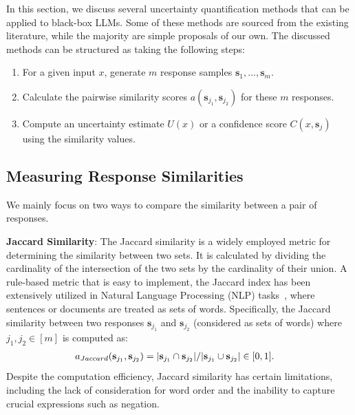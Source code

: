In this section, we discuss several uncertainty quantification methods that can be applied to black-box LLMs. 
Some of these methods are sourced from the existing literature, while the majority are simple proposals of our own. 
The discussed methods can be structured as taking the following steps:
\begin{enumerate}
    \item For a given input $x$, generate $m$ response samples $\mathbf{s}_1, \ldots, \mathbf{s}_m$.
    \item Calculate the pairwise similarity scores $a(\mathbf{s}_{j_1}, \mathbf{s}_{j_2})$ for these $m$ responses.
    \item Compute an uncertainty estimate $U(x)$ or a confidence score $C(x,\mathbf{s}_j)$ using the similarity values.
\end{enumerate}


\subsection{Measuring Response Similarities}\label{sec:methods:simmat}
We mainly focus on two ways to compare the similarity between a pair of responses.

\textbf{Jaccard Similarity}:
The Jaccard similarity is a widely employed metric for determining the similarity between two sets. 
It is calculated by dividing the cardinality of the intersection of the two sets by the cardinality of their union. 
A rule-based metric that is easy to implement, the Jaccard index has been extensively utilized in Natural Language Processing (NLP) tasks~\citep{cronin2017comparison,pilehvar-etal-2013-align,9194665}, where sentences or documents are treated as sets of words. 
Specifically, the Jaccard similarity between two responses $\mathbf{s}_{j_1}$ and $\mathbf{s}_{j_2}$ (considered as sets of words) where $j_1,j_2\in[m]$ is computed as:
\begin{align}
    a_{Jaccard}(\mathbf{s}_{j_1}, \mathbf{s}_{j_2}) &= |\mathbf{s}_{j_1} \cap \mathbf{s}_{j_2}|/|\mathbf{s}_{j_1} \cup \mathbf{s}_{j_2}| \in [0,1].
\end{align}
Despite the computation efficiency, Jaccard similarity has certain limitations, including the lack of consideration for word order and the inability to capture crucial expressions such as negation.

